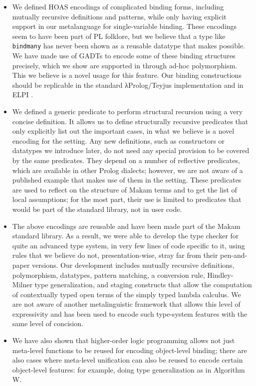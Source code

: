 \begin{itemize}
\item
  We defined HOAS encodings of complicated binding forms, including
  mutually recursive definitions and patterns, while only having
  explicit support in our metalanguage for single-variable binding.
  These encodings seem to have been part of PL folklore, but we believe
  that a type like \texttt{bindmany} has never been shown as a reusable
  datatype that \lamprolog makes possible. We have made use of GADTs to
  encode some of these binding structures precisely, which we show are
  supported in \lamprolog through ad-hoc polymorphism. This we believe
  is a novel usage for this \lamprolog feature. Our binding
  constructions should be replicable in the standard \foreignlanguage{greek}{λ}Prolog/Teyjus
  implementation \citep{teyjus-main-reference} and in ELPI
  \citep{elpi-main-reference}.
\item
  We defined a generic predicate to perform structural recursion using a
  very concise definition. It allows us to define structurally recursive
  predicates that only explicitly list out the important cases, in what
  we believe is a novel encoding for the \lamprolog
   setting. Any new definitions, such as constructors or datatypes we
  introduce later, do not need any special provision to be covered by
  the same predicates. They depend on a number of reflective predicates,
  which are available in other Prolog dialects; however, we are not
  aware of a published example that makes use of them in the \lamprolog
   setting. These predicates are used to reflect on the structure of
  Makam terms and to get the list of local assumptions; for the most
  part, their use is limited to predicates that would be part of the
  standard library, not in user code.
\item
  The above encodings are reusable and have been made part of the Makam
  standard library. As a result, we were able to develop the type
  checker for quite an advanced type system, in very few lines of code
  specific to it, using rules that we believe do not, presentation-wise,
  stray far from their pen-and-paper versions. Our development includes
  mutually recursive definitions, polymorphism, datatypes, pattern
  matching, a conversion rule, Hindley-Milner type generalization, and
  staging constructs that allow the computation of contextually typed
  open terms of the simply typed lambda calculus. We are not aware of
  another metalinguistic framework that allows this level of
  expressivity and has been used to encode such type-system features
  with the same level of concision.
\item
  We have also shown that higher-order logic programming allows not just
  meta-level functions to be reused for encoding object-level binding;
  there are also cases where meta-level unification can also be reused
  to encode certain object-level features: for example, doing type
  generalization as in Algorithm W.
\end{itemize}

